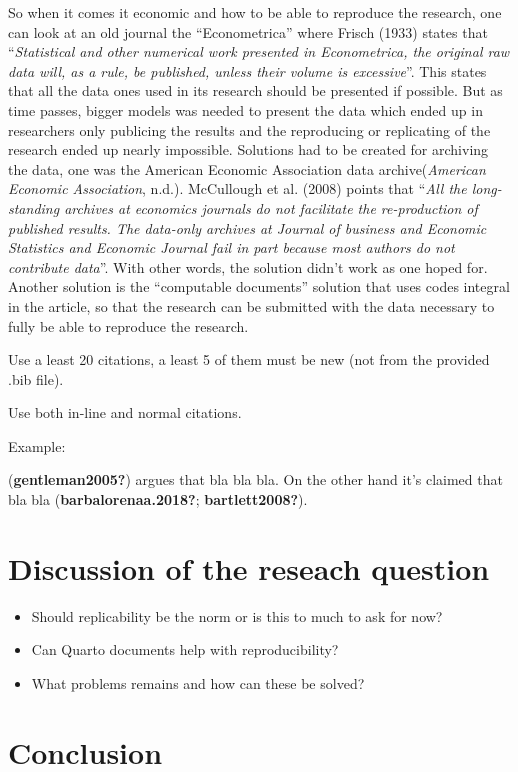 \documentclass[
  british,
  a4paper,
]{article}
\providecommand{\tightlist}{%
  \setlength{\itemsep}{0pt}\setlength{\parskip}{0pt}}
\begin{document}
So when it comes it economic and how to be able to reproduce the
research, one can look at an old journal the ``Econometrica'' where
Frisch (1933) states that ``\emph{Statistical and other numerical work
presented in Econometrica, the original raw data will, as a rule, be
published, unless their volume is excessive}''. This states that all the
data ones used in its research should be presented if possible. But as
time passes, bigger models was needed to present the data which ended up
in researchers only publicing the results and the reproducing or
replicating of the research ended up nearly impossible. Solutions had to
be created for archiving the data, one was the American Economic
Association data archive(\emph{American {Economic Association}}, n.d.).
McCullough et al. (2008) points that ``\emph{All the long-standing
archives at economics journals do not facilitate the re-production of
published results. The data-only archives at Journal of business and
Economic Statistics and Economic Journal fail in part because most
authors do not contribute data}''. With other words, the solution didn't
work as one hoped for. Another solution is the ``computable documents''
solution that uses codes integral in the article, so that the research
can be submitted with the data necessary to fully be able to reproduce
the research.

Use a least 20 citations, a least 5 of them must be new (not from the
provided .bib file).

Use both in-line and normal citations.

Example:

(\textbf{gentleman2005?}) argues that bla bla bla. On the other hand
it's claimed that bla bla (\textbf{barbalorenaa.2018?};
\textbf{bartlett2008?}).

\section{Discussion of the reseach
question}\label{discussion-of-the-reseach-question}

\begin{itemize}
\tightlist
\item
  Should replicability be the norm or is this to much to ask for now?
\item
  Can Quarto documents help with reproducibility?
\item
  What problems remains and how can these be solved?
\end{itemize}

\section{Conclusion}\label{conclusion}
\end{document}
